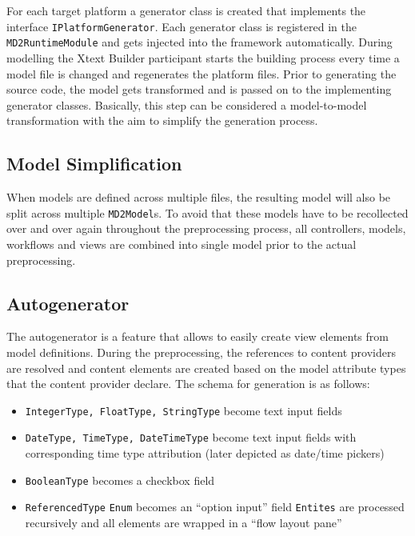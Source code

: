 
\label{sec:dev-preprocessor}

For each target platform a generator class  is created that implements the interface  \lstinline|IPlatformGenerator|. Each generator class is registered in the \lstinline|MD2RuntimeModule| and gets injected into the framework automatically. During modelling the Xtext Builder participant starts the building process every time a model file is changed and regenerates the platform files.
Prior to generating the source code, the model gets transformed and is passed on to the implementing generator classes. Basically, this step can be considered a model-to-model transformation with the aim to simplify the generation process.

\subsection{Model Simplification}

When \MD models are defined across multiple files, the resulting model will also be split across multiple \lstinline!MD2Model!s.
To avoid that these models have to be recollected over and over again throughout the preprocessing process, all controllers, models, workflows and views are combined into single model prior to the actual preprocessing.

\subsection{Autogenerator}
The autogenerator is a feature that allows to easily create view elements from model definitions. During the preprocessing, the references to content providers are resolved and content elements are created based on the model attribute types that the content provider declare. The schema for generation is as follows:

\begin{itemize}
	\item \lstinline!IntegerType, FloatType, StringType! become text input fields
	\item \lstinline!DateType, TimeType, DateTimeType! become text input fields with corresponding time type attribution (later depicted as date/time pickers)
	\item \lstinline!BooleanType! becomes a checkbox field
	\item \lstinline!ReferencedType!
		\subitem \lstinline!Enum! becomes an \enquote{option input} field
		\subitem \lstinline!Entites! are processed recursively and all elements are wrapped in a \enquote{flow layout pane}
\end{itemize}

